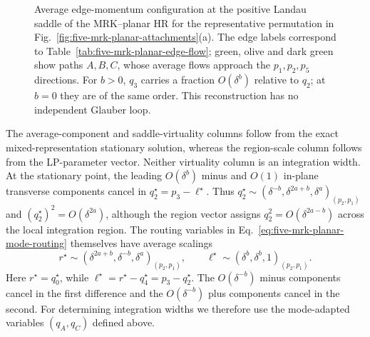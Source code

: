\documentclass[a4paper,11pt]{article}
\begin{document}
\begin{figure}[!t]
\caption{Average edge-momentum configuration at the positive
Landau saddle of the MRK--planar HR for the representative permutation in
Fig.~\ref{fig:five-mrk-planar-attachments}(a).  The edge labels correspond to
Table~\ref{tab:five-mrk-planar-edge-flow}; green, olive and dark green show
paths \(A,B,C\), whose average flows approach the \(p_1,p_2,p_5\) directions.
For \(b>0\), \(q_3\) carries a fraction \(O(\delta^b)\) relative to \(q_2\);
at \(b=0\) they are of the same order.  This reconstruction has no independent
Glauber loop.}
\label{fig:five-mrk-planar-modes}
\end{figure}
The average-component and saddle-virtuality columns follow from the exact
mixed-representation stationary solution, whereas the region-scale column follows from the
LP-parameter vector.  Neither virtuality column is an integration width.  At
the stationary point, the leading \(O(\delta^b)\) minus and \(O(1)\) in-plane
transverse components cancel in \(q_2^\star=p_3-\ell^\star\).  Thus
\(q_2^\star\sim(\delta^{-b},\delta^{2a+b},\delta^a)_{(p_2,p_1)}\) and
\((q_2^\star)^2=O(\delta^{2a})\), although the region vector assigns
\(q_2^2=O(\delta^{2a-b})\) across the local integration region.
The routing variables in Eq.~\eqref{eq:five-mrk-planar-mode-routing} themselves
have average scalings
\begin{equation}
 r^\star\sim(\delta^{2a+b},\delta^{-b},\delta^a)_{(p_2,p_1)},\qquad
 \ell^\star\sim(\delta^b,\delta^b,1)_{(p_2,p_1)}.
 \label{eq:five-mrk-planar-routing-averages}
\end{equation}
Here \(r^\star=q_0^\star\), while
\(\ell^\star=r^\star-q_4^\star=p_3-q_2^\star\).  The
\(O(\delta^{-b})\) minus components cancel in the first difference and the
\(O(\delta^{-b})\) plus components cancel in the second.  For determining
integration widths we therefore use the mode-adapted variables \((q_A,q_C)\)
defined above.
\end{document}
